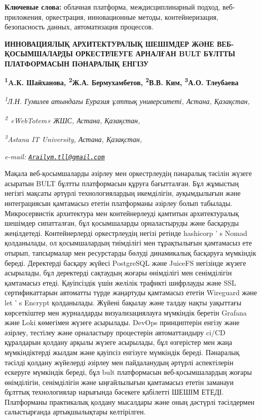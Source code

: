 {\bfseries Ключевые слова:} облачная платформа, междисциплинарный подход,
веб-приложения, оркестрация, инновационные методы, контейнеризация,
безопасность данных, автоматизация процессов.

\begin{articleheader}
{\bfseries ИННОВАЦИЯЛЫҚ АРХИТЕКТУРАЛЫҚ ШЕШІМДЕР ЖӘНЕ ВЕБ-ҚОСЫМШАЛАРДЫ
ОРКЕСТРЛЕУГЕ АРНАЛҒАН BULT БҰЛТТЫ ПЛАТФОРМАСЫН ПӘНАРАЛЫҚ ЕНГІЗУ}

{\bfseries
\textsuperscript{1}A.К. Шайханова,
\textsuperscript{2}Ж.А. Бермухамбетов,
\textsuperscript{2}В.В. Ким,
\textsuperscript{3}А.О. Тлеубаева\textsuperscript{\envelope }}
\end{articleheader}

\begin{affiliation}
\emph{\textsuperscript{1}Л.Н. Гумилев атындағы Еуразия ұлттық университеті, Астана, Қазақстан,}

\emph{\textsuperscript{2} «WebTotem» ЖШС, Астана, Қазақстан,}

\emph{\textsuperscript{3}Astana IT University, Астана, Қазақстан,}

\emph{e-mail: \href{mailto:Arailym.tll@gmail.com}{\nolinkurl{Arailym.tll@gmail.com}}}
\end{affiliation}

Мақала веб-қосымшаларды әзірлеу мен оркестрлеудің пәнаралық тәсілін
жүзеге асыратын BULT бұлтты платформасын құруға бағытталған. Бұл
жұмыстың негізгі мақсаты әртүрлі технологиялардың икемділігін,
ауқымдылығын және интеграциясын қамтамасыз ететін платформаны әзірлеу
болып табылады. Микросервистік архитектура мен контейнерлеуді қамтитын
архитектуралық шешімдер сипатталған, бұл қосымшаларды орналастыруды және
басқаруды жеңілдетеді. Контейнерлерді оркестрлеудің негізі ретінде
hashicorp '{} s Nomad қолданылады, ол қосымшалардың
тиімділігі мен тұрақтылығын қамтамасыз ете отырып, тапсырмалар мен
ресурстарды бөлуді динамикалық басқаруға мүмкіндік береді. Деректерді
басқару жүйесі PostgreSQL және JuiceFS негізінде жүзеге асырылады, бұл
деректерді сақтаудың жоғары өнімділігі мен сенімділігін қамтамасыз
етеді. Қауіпсіздік үшін желілік трафикті шифрлауды және SSL
сертификаттарын автоматты түрде жаңартуды қамтамасыз ететін Wireguard
және let '{} s Encrypt қолданылады. Жүйені бақылау және
талдау нақты уақыттағы көрсеткіштер мен журналдарды визуализациялауға
мүмкіндік беретін Grafana және Loki көмегімен жүзеге асырылады. DevOps
принциптерін енгізу және әзірлеу, тестілеу және орналастыру процестерін
автоматтандыру ci/CD құралдарын қолдану арқылы жүзеге асырылады, бұл
өзгерістер мен жаңа мүмкіндіктерді жылдам және қауіпсіз енгізуге
мүмкіндік береді. Пәнаралық тәсілді қолдану жүйелерді әзірлеу мен
пайдаланудың әртүрлі аспектілерін ескеруге мүмкіндік береді, бұл bult
платформасын веб-қосымшалардың жоғары өнімділігін, сенімділігін және
ыңғайлылығын қамтамасыз ететін заманауи бұлттық технологиялар нарығында
бәсекеге қабілетті ШЕШІМ ЕТЕДІ. Платформаны практикалық қолдану
мысалдары және оның дәстүрлі тәсілдермен салыстырғанда артықшылықтары
келтірілген.

